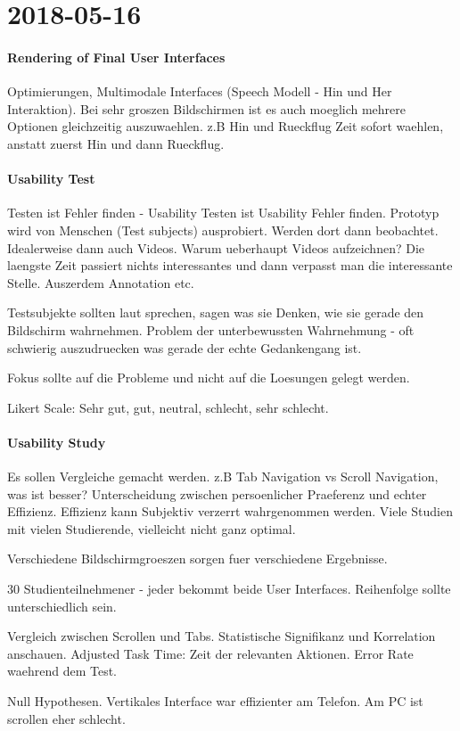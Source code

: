 \section{2018-05-16}

\paragraph{Rendering of Final User Interfaces}

Optimierungen, Multimodale Interfaces (Speech Modell - Hin und Her Interaktion).
Bei sehr groszen Bildschirmen ist es auch moeglich mehrere Optionen gleichzeitig
auszuwaehlen. z.B Hin und Rueckflug Zeit sofort waehlen, anstatt zuerst Hin und dann
Rueckflug.

\paragraph{Usability Test}

Testen ist Fehler finden - Usability Testen ist Usability Fehler finden. Prototyp wird von
Menschen (Test subjects) ausprobiert. Werden dort dann beobachtet. Idealerweise dann
auch Videos. 
Warum ueberhaupt Videos aufzeichnen? Die laengste Zeit passiert nichts interessantes und
dann verpasst man die interessante Stelle. Auszerdem Annotation etc.

Testsubjekte sollten laut sprechen, sagen was sie Denken, wie sie gerade den Bildschirm
wahrnehmen. Problem der unterbewussten Wahrnehmung - oft schwierig auszudruecken was
gerade der echte Gedankengang ist.

Fokus sollte auf die Probleme und nicht auf die Loesungen gelegt werden.

Likert Scale: Sehr gut, gut, neutral, schlecht, sehr schlecht.

\paragraph{Usability Study}
Es sollen Vergleiche gemacht werden. z.B Tab Navigation vs Scroll Navigation, was ist
besser? Unterscheidung zwischen persoenlicher Praeferenz und echter Effizienz. Effizienz
kann Subjektiv verzerrt wahrgenommen werden.
Viele Studien mit vielen Studierende, vielleicht nicht ganz optimal.

Verschiedene Bildschirmgroeszen sorgen fuer verschiedene Ergebnisse. 

30 Studienteilnehmener - jeder bekommt beide User Interfaces. Reihenfolge sollte
unterschiedlich sein.

Vergleich zwischen Scrollen und Tabs. Statistische Signifikanz und Korrelation anschauen.
Adjusted Task Time: Zeit der relevanten Aktionen. Error Rate waehrend dem Test.

Null Hypothesen. Vertikales Interface war effizienter am Telefon. Am PC ist scrollen eher
schlecht.





